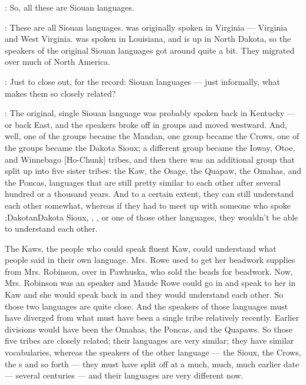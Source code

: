 \documentclass[output=paper]{LSP/langsci}
\begin{document}
: So, all these are Siouan languages.

: These are all Siouan languages.  was originally spoken in Virginia --- Virginia and West Virginia.  was spoken in Louisiana, and  is up in North Dakota, so the speakers of the original Siouan languages got around quite a bit. They migrated over much of North America.

: Just to close out, for the record: Siouan languages --- just informally, what makes them so closely related?

: The original, single Siouan language was probably spoken back in Kentucky --- or back East, and the speakers broke off in groups and moved westward. And, well, one of the groups became the Mandan, one group became the Crows, one of the groups became the Dakota Sioux; a different group became the Ioway, Otoe, and Winnebago [Ho-Chunk] tribes, and then there was an additional group that split up into five sister tribes: the Kaw, the Osage, the Quapaw, the Omahas, and the Poncas, languages that are still pretty similar to each other after several hundred or a thousand years. And to a certain extent, they can still understand each other somewhat, whereas if they had to meet up with someone who spoke \il;{Dakotan}Dakota Sioux, , , or one of those other languages, they wouldn't be able to understand each other.

The Kaws, the people who could speak fluent Kaw, could understand what  people said in their own language. Mrs. Rowe used to get her beadwork supplies from Mrs. Robinson, over in Pawhuska, who sold the beads for beadwork. Now, Mrs. Robinson was an  speaker and Maude Rowe could go in and speak to her in Kaw and she would speak back in  and they would understand each other. So those two languages are quite close. And the speakers of those languages must have diverged from what must have been a single tribe relatively recently. Earlier divisions would have been the Omahas, the Poncas, and the Quapaws. So those five tribes are closely related; their languages are very similar; they have similar vocabularies, whereas the speakers of the other language --- the Sioux, the Crows, the s and so forth --- they must have split off at a much, much, much earlier date --- several centuries --- and their languages are very different now.
\end{document}
